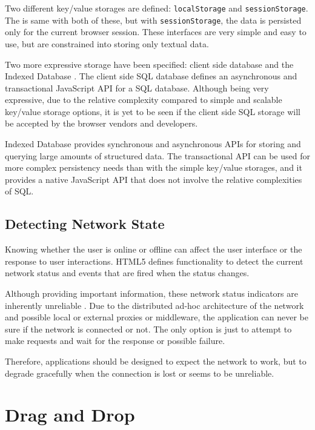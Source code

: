 Two different key/value storages are defined: \texttt{localStorage}
and \texttt{sessionStorage}. The  is same with both of
these, but with \texttt{sessionStorage}, the data is persisted only
for the current browser session. These interfaces are very simple and
easy to use, but are constrained into storing only textual
data. \cite{webstoragedraft}

Two more expressive storage  have been specified: client
side  database \cite{webstoragedraft} and the Indexed
Database \cite{indexedDBdraft}. The client side SQL database defines
an asynchronous and transactional JavaScript API for a SQL
database. Although being very expressive, due to the relative
complexity compared to simple and scalable key/value storage options,
it is yet to be seen if the client side SQL storage will be accepted
by the browser vendors and developers.

Indexed Database provides synchronous and asynchronous APIs for
storing and querying large amounts of structured data. The
transactional API can be used for more complex persistency needs than
with the simple key/value storages, and it provides a native
JavaScript API that does not involve the relative complexities of SQL.

\subsection{Detecting Network State}

Knowing whether the user is online or offline can affect the user
interface or the response to user interactions. HTML5 defines
functionality to detect the current network status and events that are
fired when the status changes. \cite{HTML5draft}

Although providing important information, these network status
indicators are inherently unreliable \cite{HTML5draft}. Due to the
distributed ad-hoc architecture of the network and possible local or
external proxies or middleware, the application can never be sure if
the network is connected or not. The only option is just to attempt to
make requests and wait for the response or possible failure.

Therefore, applications should be designed to expect the network to
work, but to degrade gracefully when the connection is lost or seems
to be unreliable.

\section{Drag and Drop}
\label{section:dragdrop}

